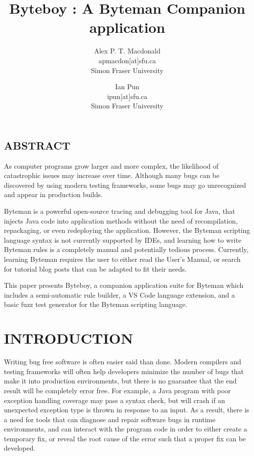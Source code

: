 \documentclass[letterpaper,twocolumn,10pt]{article}
\begin{document}
\date{}

\title{\Large \bf Byteboy : A Byteman Companion application}

\author{
{\rm Alex P. T. Macdonald}\\
apmacdon[at]sfu.ca\\
Simon Fraser University
\and
{\rm Ian Pun}\\
ipun[at]sfu.ca\\
Simon Fraser University
} %

\maketitle

\subsection*{ABSTRACT}
As computer programs grow larger and more complex, the likelihood of catastrophic issues may increase over time. Although many bugs can be discovered by using modern testing frameworks, some bugs may go unrecognized and appear in production builds. 

Byteman is a powerful open-source tracing and debugging tool for Java, that injects Java code into application methods without the need of recompilation, repackaging, or even redeploying the application. However, the Byteman scripting language syntax is not currently supported by IDEs, and learning how to write Byteman rules is a completely manual and potentially tedious process. Currently, learning Byteman requires the user to either read the User's Manual, or search for tutorial blog posts that can be adapted to fit their needs. 

This paper presents Byteboy, a companion application suite for Byteman which includes a semi-automatic rule builder, a VS Code language extension, and a basic fuzz test generator for the Byteman scripting language.  

\section{INTRODUCTION}

Writing bug free software is often easier said than done. Modern compilers and testing frameworks will often help developers minimize the number of bugs that make it into production environments, but there is no guarantee that the end result will be completely error free. For example, a Java program with poor exception handling coverage may pass a syntax check, but will crash if an unexpected exception type is thrown in response to an input. As a result, there is a need for tools that can diagnose and repair software bugs in runtime environments, and can interact with the program code in order to either create a temporary fix, or reveal the root cause of the error such that a proper fix can be developed.
\end{document}
